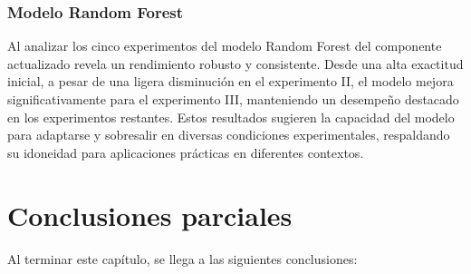 \subsubsection*{Modelo Random Forest}
Al analizar los cinco experimentos del modelo Random Forest del componente actualizado revela un rendimiento robusto y consistente. Desde una alta exactitud inicial, a pesar de una ligera disminución en el experimento II, el modelo mejora significativamente para el experimento III, manteniendo un desempeño destacado en los experimentos restantes. Estos resultados sugieren la capacidad del modelo para adaptarse y sobresalir en diversas condiciones experimentales, respaldando su idoneidad para aplicaciones prácticas en diferentes contextos.

\section{Conclusiones parciales}
Al terminar este capítulo, se llega a las siguientes conclusiones: 

